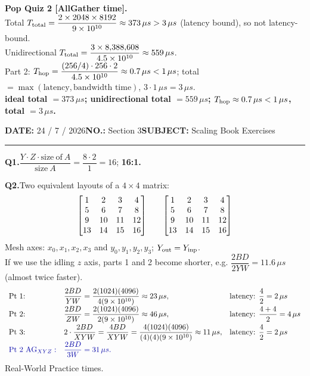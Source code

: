 \documentclass[10pt]{article}
\newcommand{\note}[1]{\textcolor{blue!55!black}{#1}}
\newcommand{\answer}[1]{\textcolor{blue!65!black}{\textbf{#1}}}
\newcommand{\question}[1]{\par\vspace{0.9em}\noindent\textbf{#1}\quad}
\newcommand{\meta}[2]{\textbf{#1} #2\hspace{2.5em}}
\newcommand{\pagehead}[2]{%
 {\small\meta{DATE:}{#1}\meta{NO.:}{#2}\meta{SUBJECT:}{Scaling Book Exercises}}\par\vspace{0.8em}\hrule\vspace{0.8em}}
\begin{document}
\question{Pop Quiz 2 [AllGather time].}\\
Total $T_{\rm total}=\dfrac{2\times2048\times8192}{9\times10^{10}}\approx373\,\mu s>3\,\mu s$ (latency bound), so not latency-bound.\\
Unidirectional $T_{\rm total}=\dfrac{3\times8{,}388{,}608}{4.5\times10^{10}}\approx559\,\mu s$.\\
Part 2: $T_{\rm hop}=\dfrac{(256/4)\cdot256\cdot2}{4.5\times10^{10}}\approx0.7\,\mu s<1\,\mu s$; total $=\max(\text{latency},\text{bandwidth time})$, $3\cdot1\,\mu s=3\,\mu s$.\\
\answer{ideal total $=373\,\mu s$; unidirectional total $=559\,\mu s$; $T_{\rm hop}\approx0.7\,\mu s<1\,\mu s$, total $=3\,\mu s$.}

\newpage
\pagehead{24 / 7 / 2026}{Section 3}
\question{Q1.}$\dfrac{Y\cdot Z\cdot\mathrm{size\ of\ }A}{\mathrm{size\ }A}=\dfrac{8\cdot2}{1}=16$; \answer{16:1.}

\question{Q2.}Two equivalent layouts of a $4\times4$ matrix:
\[
\begin{array}{c@{\qquad}c}
\begin{bmatrix}1&2&3&4\\5&6&7&8\\9&10&11&12\\13&14&15&16\end{bmatrix}&
\begin{bmatrix}1&2&3&4\\5&6&7&8\\9&10&11&12\\13&14&15&16\end{bmatrix}
\end{array}
\]
Mesh axes: $x_0,x_1,x_2,x_3$ and $y_0,y_1,y_2,y_3$; $Y_{\rm out}=Y_{\rm inp}$.\\
\note{If we use the idling $z$ axis, parts 1 and 2 become shorter, e.g. $\dfrac{2BD}{2YW}=11.6\,\mu s$ (almost twice faster).}
\[
\begin{array}{lll}
\text{Pt 1:}&\dfrac{2BD}{YW}=\dfrac{2(1024)(4096)}{4(9\times10^{10})}\approx23\,\mu s,&\text{latency: }\dfrac{4}{2}=2\,\mu s\\[0.6em]
\text{Pt 2:}&\dfrac{2BD}{ZW}=\dfrac{2(1024)(4096)}{2(9\times10^{10})}\approx46\,\mu s,&\text{latency: }\dfrac{4+4}{2}=4\,\mu s\\[0.6em]
\text{Pt 3:}&2\cdot\dfrac{2BD}{XYW}=\dfrac{4BD}{XYW}=\dfrac{4(1024)(4096)}{(4)(4)(9\times10^{10})}\approx11\,\mu s,&\text{latency: }\dfrac{4}{2}=2\,\mu s\\[0.6em]
\textcolor{blue!65!black}{\text{Pt 2 }\mathrm{AG}_{XYZ}:}&\textcolor{blue!65!black}{\dfrac{2BD}{3W}=31\,\mu s.}&
\end{array}
\]
\note{Real-World Practice times.}
\end{document}
